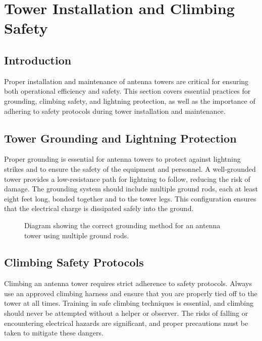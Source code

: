 \section{Tower Installation and Climbing Safety}
\label{section:tower_safety}

\subsection*{Introduction}
Proper installation and maintenance of antenna towers are critical for ensuring both operational efficiency and safety. This section covers essential practices for grounding, climbing safety, and lightning protection, as well as the importance of adhering to safety protocols during tower installation and maintenance.

\subsection*{Tower Grounding and Lightning Protection}
Proper grounding is essential for antenna towers to protect against lightning strikes and to ensure the safety of the equipment and personnel. A well-grounded tower provides a low-resistance path for lightning to follow, reducing the risk of damage. The grounding system should include multiple ground rods, each at least eight feet long, bonded together and to the tower legs. This configuration ensures that the electrical charge is dissipated safely into the ground.

\begin{figure}[h]
    \centering
    \caption{Diagram showing the correct grounding method for an antenna tower using multiple ground rods.}
    \label{fig:tower_grounding}
\end{figure}

\subsection*{Climbing Safety Protocols}
Climbing an antenna tower requires strict adherence to safety protocols. Always use an approved climbing harness and ensure that you are properly tied off to the tower at all times. Training in safe climbing techniques is essential, and climbing should never be attempted without a helper or observer. The risks of falling or encountering electrical hazards are significant, and proper precautions must be taken to mitigate these dangers.

